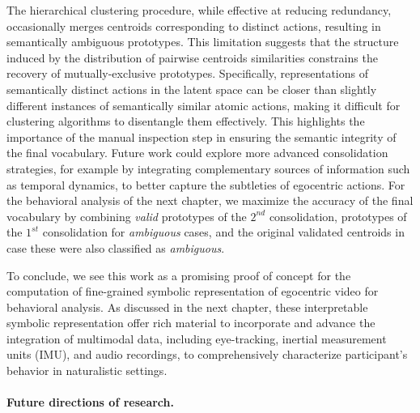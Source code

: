     The hierarchical clustering procedure, while effective at reducing redundancy, occasionally merges centroids corresponding to distinct actions, resulting in semantically ambiguous prototypes. This limitation suggests that the structure induced by the distribution of pairwise centroids similarities constrains the recovery of mutually-exclusive prototypes. Specifically, representations of semantically distinct actions in the latent space can be closer than slightly different instances of semantically similar atomic actions, making it difficult for clustering algorithms to disentangle them effectively. This highlights the importance of the manual inspection step in ensuring the semantic integrity of the final vocabulary. Future work could explore more advanced consolidation strategies, for example by integrating complementary sources of information such as temporal dynamics, to better capture the subtleties of egocentric actions. For the behavioral analysis of the next chapter, we maximize the accuracy of the final vocabulary by combining \textit{valid} prototypes of the $2^{nd}$ consolidation, prototypes of the $1^{st}$ consolidation for \textit{ambiguous} cases, and the original validated centroids in case these were also classified as \textit{ambiguous}.

    To conclude, we see this work as a promising proof of concept for the computation of fine-grained symbolic representation of egocentric video for behavioral analysis. As discussed in the next chapter, these interpretable symbolic representation offer rich material to incorporate and advance the integration of multimodal data, including eye-tracking, inertial measurement units (IMU), and audio recordings, to comprehensively characterize participant's behavior in naturalistic settings.


    \paragraph{Future directions of research.\\}

